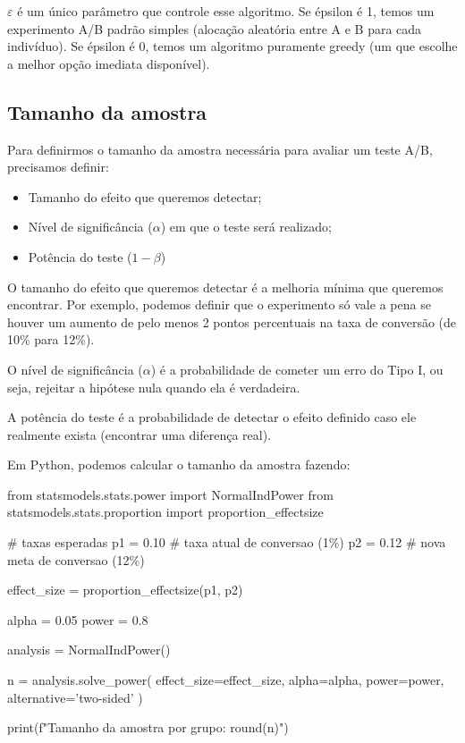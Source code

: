\documentclass{article}
\begin{document}
$\varepsilon$ é um único parâmetro que controle esse algoritmo. Se épsilon é 1, temos um 
experimento A/B padrão simples (alocação aleatória entre A e B para cada indivíduo). 
Se épsilon é 0, temos um algoritmo puramente greedy (um que escolhe a melhor opção 
imediata disponível).

\subsection{Tamanho da amostra}

Para definirmos o tamanho da amostra necessária para avaliar um teste A/B, precisamos 
definir:

\begin{itemize}
    \item Tamanho do efeito que queremos detectar;
    \item Nível de significância ($\alpha$) em que o teste será realizado;
    \item Potência do teste ($1 - \beta$)
\end{itemize}

O tamanho do efeito que queremos detectar é a melhoria mínima que queremos encontrar.
Por exemplo, podemos definir que o experimento só vale a pena se houver um aumento de 
pelo menos 2 pontos percentuais na taxa de conversão (de 10\% para 12\%).

O nível de significância ($\alpha$) é a probabilidade de cometer um erro do Tipo I, ou seja,
rejeitar a hipótese nula quando ela é verdadeira. 

A potência do teste é a probabilidade de detectar o efeito definido caso ele realmente exista 
(encontrar uma diferença real).

Em Python, podemos calcular o tamanho da amostra fazendo:

\begin{pythoncode}
from statsmodels.stats.power import NormalIndPower
from statsmodels.stats.proportion import proportion_effectsize 

# taxas esperadas
p1 = 0.10 # taxa atual de conversao (1\%)
p2 = 0.12 # nova meta de conversao (12\%)

effect_size = proportion_effectsize(p1, p2)

alpha = 0.05
power = 0.8

analysis = NormalIndPower()

n = analysis.solve_power(
    effect_size=effect_size,
    alpha=alpha,
    power=power,
    alternative='two-sided'
)

print(f"Tamanho da amostra por grupo: {round(n)}")
\end{pythoncode}
\end{document}

